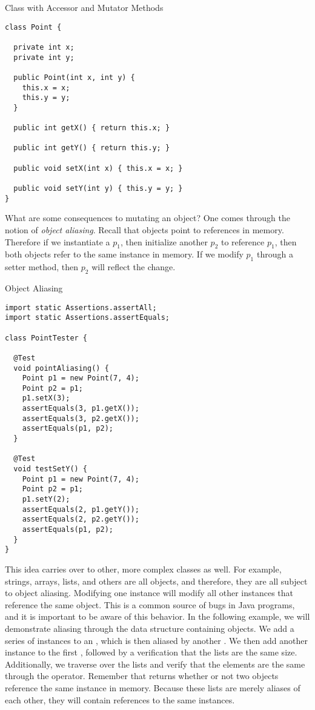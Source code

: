 \begin{cl}[]{ Class with Accessor and Mutator Methods}
\begin{lstlisting}[language=MyJava]
class Point {

  private int x;
  private int y;

  public Point(int x, int y) { 
    this.x = x; 
    this.y = y; 
  }

  public int getX() { return this.x; }

  public int getY() { return this.y; }

  public void setX(int x) { this.x = x; }

  public void setY(int y) { this.y = y; }
}
\end{lstlisting}
\end{cl}

What are some consequences to mutating an object? One comes through the notion of \textit{object aliasing}. Recall that objects point to references in memory. Therefore if we instantiate a  $p_1$, then initialize another  $p_2$ to reference $p_1$, then both objects refer to the same  instance in memory. If we modify $p_1$ through a setter method, then $p_2$ will reflect the change.

\begin{cl}[]{Object Aliasing}
\begin{lstlisting}[language=MyJava]
import static Assertions.assertAll;
import static Assertions.assertEquals;

class PointTester {

  @Test
  void pointAliasing() {
    Point p1 = new Point(7, 4);
    Point p2 = p1;
    p1.setX(3);
    assertEquals(3, p1.getX());
    assertEquals(3, p2.getX());
    assertEquals(p1, p2);
  }

  @Test
  void testSetY() {
    Point p1 = new Point(7, 4);
    Point p2 = p1;
    p1.setY(2);
    assertEquals(2, p1.getY());
    assertEquals(2, p2.getY());
    assertEquals(p1, p2);
  }
}
\end{lstlisting}
\end{cl}

This idea carries over to other, more complex classes as well. For example, strings, arrays, lists, and others are all objects, and therefore, they are all subject to object aliasing. Modifying one  instance will modify all other  instances that reference the same object. This is a common source of bugs in Java programs, and it is important to be aware of this behavior. In the following example, we will demonstrate aliasing through the  data structure containing  objects. We add a series of  instances to an , which is then aliased by another . We then add another  instance to the first , followed by a verification that the lists are the same size. Additionally, we traverse over the lists and verify that the elements are the same through the \ttt{==} operator. Remember that \ttt{==} returns whether or not two objects reference the same instance in memory. Because these lists are merely aliases of each other, they will contain references to the same  instances.

